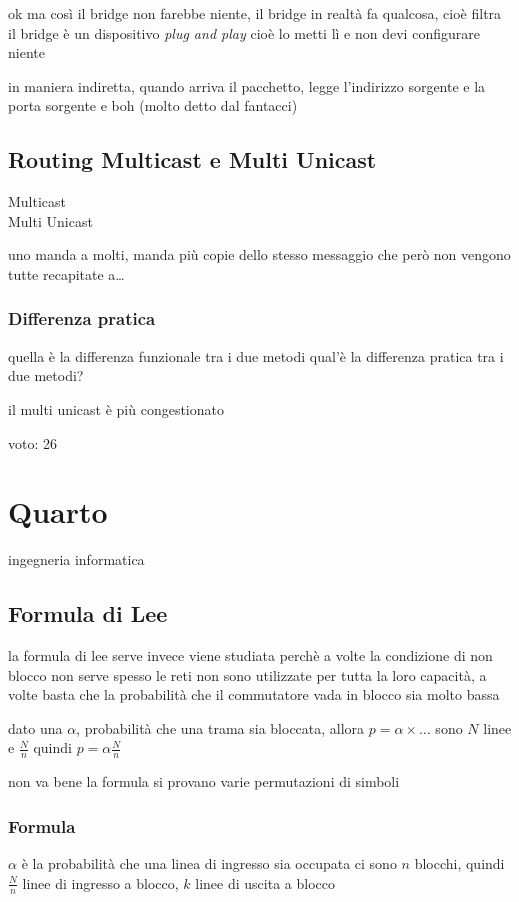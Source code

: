 \documentclass[11pt]{article}
\begin{document}
ok ma così il bridge non farebbe niente, il bridge in realtà fa qualcosa, cioè filtra
il bridge è un dispositivo \emph{plug and play} cioè lo metti lì e non devi configurare niente

in maniera indiretta, quando arriva il pacchetto, legge l'indirizzo sorgente e la porta sorgente e boh
(molto detto dal fantacci)

\subsection{Routing Multicast e Multi Unicast}
\label{sec:orgc3266a3}
\begin{description}
\item[{Multicast}] 

\item[{Multi Unicast}] 
\end{description}
uno manda a molti, manda più copie dello stesso messaggio che però non vengono tutte recapitate a\ldots{}

\subsubsection{Differenza pratica}
\label{sec:org5900f31}
quella è la differenza funzionale tra i due metodi
qual'è la differenza pratica tra i due metodi?

il multi unicast è più congestionato

voto: 26

\section{Quarto}
\label{sec:org5cea448}
ingegneria informatica
\subsection{Formula di Lee}
\label{sec:orga79c4a9}
la formula di lee serve invece
viene studiata perchè a volte la condizione di non blocco non serve
spesso le reti non sono utilizzate per tutta la loro capacità, a volte basta che la probabilità che il commutatore vada in blocco sia molto bassa

dato una \(\alpha\), probabilità che una trama sia bloccata, allora \(p = \alpha \times \dots\) 
sono \(N\) linee e \(\frac{N}{n}\) quindi \(p = \alpha \frac{N}{n}\)

non va bene la formula
si provano varie permutazioni di simboli

\subsubsection{Formula}
\label{sec:org248ee93}
\(\alpha\) è la probabilità che una linea di ingresso sia occupata
ci sono \(n\) blocchi, quindi \(\frac{N}{n}\) linee di ingresso a blocco, \(k\) linee di uscita a blocco
\end{document}
